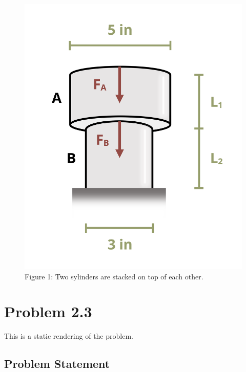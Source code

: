 \documentclass[
  letterpaper,
  DIV=11,
  numbers=noendperiod]{scrreprt}
\begin{document}
\begin{figure}[H]

{\centering \includegraphics{images/139.png}

}

\caption{Figure 1: Two sylinders are stacked on top of each other.}

\end{figure}%

\chapter*{Problem 2.3}\label{problem-2.3-1}


This is a static rendering of the problem.

\section*{Problem Statement}\label{problem-statement-2}
\end{document}
